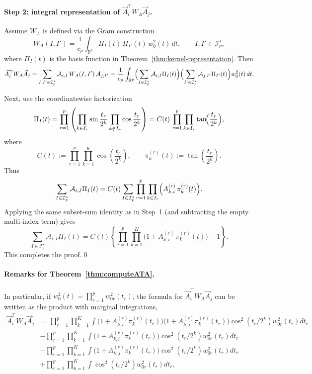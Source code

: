 \documentclass[12pt,reqno,oneside]{amsbook}
\theoremstyle{definition}
\theoremstyle{remark}
\begin{document}
\paragraph{Step 2: integral representation of $\vec A_i^\top W_A \vec A_j$.}
Assume $W_A$ is defined via the Gram construction
\[
W_A(I,I')
=
\frac{1}{c_p}
\int_{\mathbb R^p} \Pi_I(t)\,\Pi_{I'}(t)\,w_0^2(t)\,dt,
\qquad I,I'\in\mathcal I_p^\star,
\]
where $\Pi_I(t)$ is the basis function in
Theorem~\ref{thm:kernel-representation}.
Then
\[
\vec A_i^\top W_A \vec A_j
=
\sum_{I,I'\in\mathcal I_p^\star}\mathcal A_{i,I}\,W_A(I,I')\,\mathcal A_{j,I'}
=
\frac{1}{c_p}\int_{\mathbb R^p}
\Bigl(\sum_{I\in\mathcal I_p^\star}\mathcal A_{i,I}\Pi_I(t)\Bigr)
\Bigl(\sum_{I'\in\mathcal I_p^\star}\mathcal A_{j,I'}\Pi_{I'}(t)\Bigr)
w_0^2(t)\,dt.
\]

Next, use the coordinatewise factorization
\[
\Pi_I(t)
=
\prod_{r=1}^p
\left(
\prod_{k\in I_r}\sin\frac{t_r}{2^k}
\prod_{k\notin I_r}\cos\frac{t_r}{2^k}
\right)
=
C(t)\,
\prod_{r=1}^p\prod_{k\in I_r}\tan\!\Bigl(\frac{t_r}{2^k}\Bigr),
\]
where
\[
C(t):=\prod_{r=1}^p\prod_{k=1}^K \cos\!\left(\frac{t_r}{2^k}\right),
\qquad
\pi_k^{(r)}(t):=\tan\!\left(\frac{t_r}{2^k}\right).
\]
Thus
\[
\sum_{I\in\mathcal I_p^\star}\mathcal A_{i,I}\Pi_I(t)
=
C(t)\sum_{I\in\mathcal I_p^\star}
\prod_{r=1}^p\prod_{k\in I_r}\Bigl(A^{(r)}_{k,i}\,\pi_k^{(r)}(t)\Bigr).
\]
Applying the same subset-sum identity as in Step~1 (and subtracting the empty
multi-index term) gives
\[
\sum_{I\in\mathcal I_p^\star}\mathcal A_{i,I}\Pi_I(t)
=
C(t)\left\{
\prod_{r=1}^p\prod_{k=1}^K\bigl(1+A^{(r)}_{k,i}\,\pi_k^{(r)}(t)\bigr)-1
\right\}.
\] 
This completes the proof.\qed


\paragraph{Remarks for Theorem~\ref{thm:computeATA}.} In particular, 
if $w_0^2(t)=\prod _{r=1}^p w_{0r}^2(t_r)$, the formula for $\vec A_i^\top W_A \vec A_j$ can be written as the product with marginal integrations, 
\begin{align*}
\vec A_i^\top W_A \vec A_j
&=
\prod_{r=1}^p\prod_{k=1}^K
\int \bigl(1+A^{(r)}_{k,i}\pi_k^{(r)}(t_r)\bigr)\bigl(1+A^{(r)}_{k,j}\pi_k^{(r)}(t_r)\bigr)\cos^2(t_r/2^k)w_{0r}^2(t_r)dt_r\\
&-\prod_{r=1}^p\prod_{k=1}^K\int
\bigl(1+A^{(r)}_{k,i}\pi_k^{(r)}(t_r)\bigr)\cos^2(t_r/2^k)w_{0r}^2(t_r)dt_r\\
&-\prod_{r=1}^p\prod_{k=1}^K\int
\bigl(1+A^{(r)}_{k,j}\pi_k^{(r)}(t_r)\bigr)\cos^2(t_r/2^k)w_{0r}^2(t_r)dt_r\\
&+\prod_{r=1}^p\prod_{k=1}^K\int\cos^2(t_r/2^k)w_{0r}^2(t_r)dt_r.
\end{align*}
\end{document}
